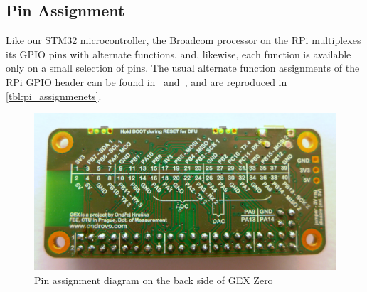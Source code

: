 \subsection{Pin Assignment}

Like our STM32 microcontroller, the Broadcom processor on the RPi multiplexes its \gls{GPIO} pins with alternate functions, and, likewise, each function is available only on a small selection of pins. The usual alternate function assignments of the RPi \gls{GPIO} header can be found in~\cite{piheader} and~\cite{piheaderxyz}, and are reproduced in \cref{tbl:pi_assignmenets}.

\begin{figure}[h]
	\centering
	\includegraphics[width=.85\textwidth]{img/photo-zero-naked-bottom.jpg}
	\caption[GEX Zero back side]{\label{fig:gexz}Pin assignment diagram on the back side of GEX Zero}
\end{figure}

